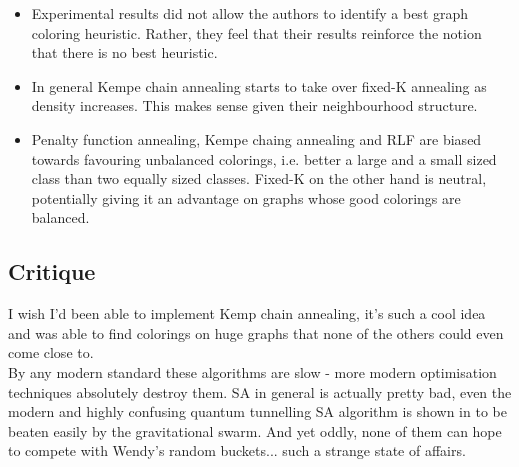 \begin{itemize}
	\item Experimental results did not allow the authors to identify a best graph coloring heuristic. Rather, they feel that their results reinforce the notion that there is no best heuristic.
	\item In general Kempe chain annealing starts to take over fixed-K annealing as density increases. This makes sense given their neighbourhood structure.
	\item Penalty function annealing, Kempe chaing annealing and RLF are biased towards favouring unbalanced colorings, i.e. better a large and a small sized class than two equally sized classes. Fixed-K on the other hand is neutral, potentially giving it an advantage on graphs whose good colorings are balanced.
	\end{itemize}

\subsection{Critique}
I wish I'd been able to implement Kemp chain annealing, it's such a cool idea and was able to find colorings on huge graphs that none of the others could even come close to.\\
By any modern standard these algorithms are slow - more modern optimisation techniques absolutely destroy them. SA in general is actually pretty bad, even the modern and highly confusing quantum tunnelling SA algorithm is shown in to be beaten easily by the gravitational swarm. And yet oddly, none of them can hope to compete with Wendy's random buckets... such a strange state of affairs.



